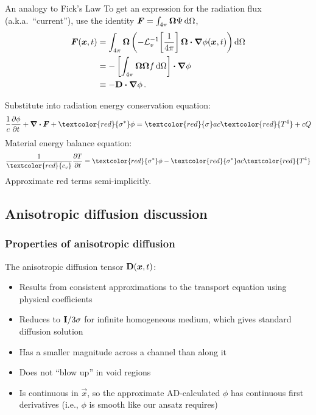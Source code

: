 \documentclass{beamer}
\begin{document}
\begin{frame}{An analogy to Fick's Law}
  To get an expression for the radiation flux (a.k.a.~``current''), use the identity
  $\bm{F} = \int_{4\pi}\bm{\Omega} \Psi \mathop{}\!\mathrm{d} \Omega$,
  \begin{align*}
    \bm{F}(\bm{x}, t)
    &= \int_{4\pi}\bm{\Omega} \left( - \mathcal{L}_{v}^{-1}\!\left[
    \frac1{4\pi} \right] \bm{\Omega}\bm{\cdot} \bm{\nabla} \phi(\bm{x},t) \right)
    \mathop{}\!\mathrm{d} \Omega
    \\
      &= - \left[ \int_{4\pi}\bm{\Omega}\bm{\Omega} f \mathop{}\!\mathrm{d} \Omega\right] \bm{\cdot} \bm{\nabla} \phi
    \\
      &\equiv -\mathbf{D} \bm{\cdot} \bm{\nabla} \phi \,.
  \end{align*}

  Substitute into radiation energy conservation equation:
\begin{equation*}
  \frac{1}{c} \pder{\phi}{t}
  + \del \vd \vec{F} + \textcolor{red}{\sigma^*} \phi
  = \textcolor{red}{\sigma} ac\textcolor{red}{T^4}
  + c Q
\end{equation*}
Material energy balance equation:
\begin{equation*}
  \frac{1}{\textcolor{red}{c_v}}\pder{T}{t} = \textcolor{red}{\sigma^*} \phi -
  \textcolor{red}{\sigma^*} ac\textcolor{red}{T^4}
\end{equation*}
Approximate red terms semi-implicitly.

\end{frame}

\subsection{Anisotropic diffusion discussion}
\begin{frame}
  \frametitle{Properties of anisotropic diffusion}

  The anisotropic diffusion tensor $\mathbf{D}(\bm{x},t)$: 
  \begin{itemize}
    \item Results from consistent approximations to the transport equation
      using physical coefficients
    \item Reduces to $\mathbf{I}/3\sigma$ for infinite homogeneous
      medium, which gives standard diffusion solution
    \item Has a smaller magnitude across a channel than along it
    \item Does not ``blow up'' in void regions
    \item Is continuous in $\vec{x}$, so the approximate AD-calculated $\phi$
      has continuous first derivatives (i.e., $\phi$ is smooth like our ansatz
      requires)
  \end{itemize}
\end{frame}
\end{document}
